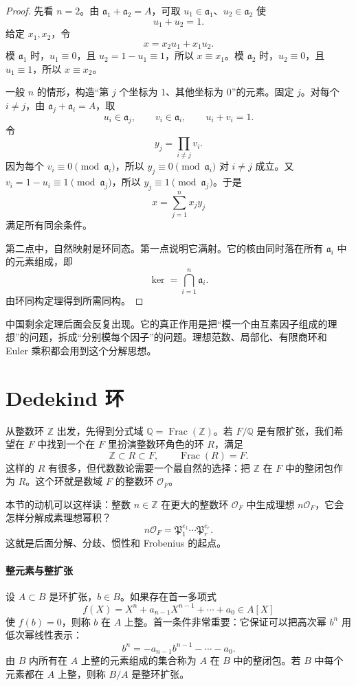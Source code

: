 \documentclass[11pt,a4paper,openany]{ctexbook}
\numberwithin{equation}{chapter}
\newcommand{\Q}{\mathbb{Q}}
\newcommand{\Z}{\mathbb{Z}}
\theoremstyle{plain}
\theoremstyle{definition}
\theoremstyle{remark}
\begin{document}
\begin{proof}
先看 $n=2$。由 $\mathfrak a_1+\mathfrak a_2=A$，可取 $u_1\in\mathfrak a_1$、$u_2\in\mathfrak a_2$ 使
\[
u_1+u_2=1.
\]
给定 $x_1,x_2$，令
\[
x=x_2u_1+x_1u_2.
\]
模 $\mathfrak a_1$ 时，$u_1\equiv0$，且 $u_2=1-u_1\equiv1$，所以 $x\equiv x_1$。模 $\mathfrak a_2$ 时，$u_2\equiv0$，且 $u_1\equiv1$，所以 $x\equiv x_2$。

一般 $n$ 的情形，构造“第 $j$ 个坐标为 $1$、其他坐标为 $0$”的元素。固定 $j$。对每个 $i\ne j$，由 $\mathfrak a_j+\mathfrak a_i=A$，取
\[
u_i\in\mathfrak a_j,\qquad v_i\in\mathfrak a_i,\qquad u_i+v_i=1.
\]
令
\[
y_j=\prod_{i\ne j}v_i.
\]
因为每个 $v_i\equiv0\pmod{\mathfrak a_i}$，所以 $y_j\equiv0\pmod{\mathfrak a_i}$ 对 $i\ne j$ 成立。又 $v_i=1-u_i\equiv1\pmod{\mathfrak a_j}$，所以 $y_j\equiv1\pmod{\mathfrak a_j}$。于是
\[
x=\sum_{j=1}^n x_jy_j
\]
满足所有同余条件。

第二点中，自然映射是环同态。第一点说明它满射。它的核由同时落在所有 $\mathfrak a_i$ 中的元素组成，即
\[
\ker=\bigcap_{i=1}^n\mathfrak a_i.
\]
由环同构定理得到所需同构。
\end{proof}

中国剩余定理后面会反复出现。它的真正作用是把“模一个由互素因子组成的理想”的问题，拆成“分别模每个因子”的问题。理想范数、局部化、有限商环和 Euler 乘积都会用到这个分解思想。

\section{Dedekind 环}
从整数环 $\Z$ 出发，先得到分式域 $\Q=\operatorname{Frac}(\Z)$。若 $F/\Q$ 是有限扩张，我们希望在 $F$ 中找到一个在 $F$ 里扮演整数环角色的环 $R$，满足
\[
\Z\subset R\subset F,\qquad \operatorname{Frac}(R)=F.
\]
这样的 $R$ 有很多，但代数数论需要一个最自然的选择：把 $\Z$ 在 $F$ 中的整闭包作为 $R$。这个环就是数域 $F$ 的整数环 $\mathcal O_F$。

本节的动机可以这样读：整数 $n\in\Z$ 在更大的整数环 $\mathcal O_F$ 中生成理想 $n\mathcal O_F$，它会怎样分解成素理想幂积？
\[
n\mathcal O_F=\mathfrak P_1^{e_1}\cdots\mathfrak P_r^{e_r}.
\]
这就是后面分解、分歧、惯性和 Frobenius 的起点。

\paragraph{整元素与整扩张}
设 $A\subset B$ 是环扩张，$b\in B$。如果存在首一多项式
\[
f(X)=X^n+a_{n-1}X^{n-1}+\cdots+a_0\in A[X]
\]
使 $f(b)=0$，则称 $b$ 在 $A$ 上整。首一条件非常重要：它保证可以把高次幂 $b^n$ 用低次幂线性表示：
\[
b^n=-a_{n-1}b^{n-1}-\cdots-a_0.
\]
由 $B$ 内所有在 $A$ 上整的元素组成的集合称为 $A$ 在 $B$ 中的整闭包。若 $B$ 中每个元素都在 $A$ 上整，则称 $B/A$ 是整环扩张。
\end{document}
